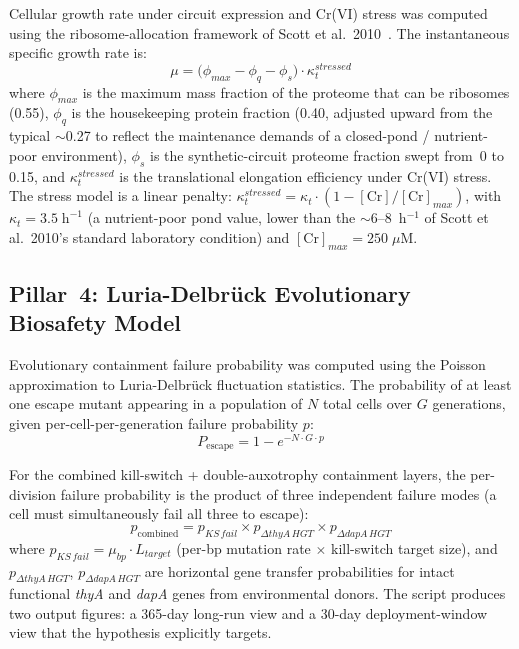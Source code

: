 \documentclass[10pt,twocolumn,letterpaper,
              colorlinks=true,
              linkcolor=blue!70!black,
              citecolor=blue!70!black,
              urlcolor=blue!70!black,
              pdfborder={0 0 0}]{article}
\begin{document}
Cellular growth rate under circuit expression and Cr(VI) stress was
computed using the ribosome-allocation framework of Scott et
al.~2010~\cite{scott2010}. The instantaneous specific growth rate is:
\begin{equation}
  \mu = \bigl(\phi_{max} - \phi_q - \phi_s\bigr)
        \cdot \kappa_t^{stressed}
\end{equation}
where $\phi_{max}$ is the maximum mass fraction of the proteome that can
be ribosomes (0.55), $\phi_q$ is the housekeeping protein fraction
(0.40, adjusted upward from the typical $\sim$0.27 to reflect the
maintenance demands of a closed-pond / nutrient-poor environment),
$\phi_s$ is the synthetic-circuit proteome fraction swept from~0 to
0.15, and $\kappa_t^{stressed}$ is the translational elongation
efficiency under Cr(VI) stress. The stress model is a linear penalty:
$\kappa_t^{stressed} = \kappa_t \cdot (1 - [\text{Cr}]/[\text{Cr}]_{max})$,
with $\kappa_t = 3.5\;\text{h}^{-1}$ (a nutrient-poor pond value, lower
than the $\sim$6--8~h$^{-1}$ of Scott et al.~2010's standard laboratory
condition) and $[\text{Cr}]_{max} = 250\;\mu$M.

\subsection{Pillar~4: Luria-Delbr\"{u}ck Evolutionary Biosafety Model}

Evolutionary containment failure probability was computed using the
Poisson approximation to Luria-Delbr\"{u}ck fluctuation statistics. The
probability of at least one escape mutant appearing in a population of
$N$ total cells over $G$ generations, given per-cell-per-generation
failure probability $p$:
\begin{equation}
  P_{\text{escape}} = 1 - e^{-N \cdot G \cdot p}
\end{equation}

For the combined kill-switch + double-auxotrophy containment layers, the
per-division failure probability is the product of three independent
failure modes (a cell must simultaneously fail all three to escape):
\begin{equation}
  p_{\text{combined}}
  = p_{KS\,fail} \times p_{\Delta thyA\,HGT}
    \times p_{\Delta dapA\,HGT}
\end{equation}
where $p_{KS\,fail} = \mu_{bp} \cdot L_{target}$ (per-bp mutation rate
$\times$ kill-switch target size), and $p_{\Delta thyA\,HGT}$,
$p_{\Delta dapA\,HGT}$ are horizontal gene transfer probabilities for
intact functional \textit{thyA} and \textit{dapA} genes from
environmental donors. The script produces two output figures: a 365-day
long-run view and a 30-day deployment-window view that the hypothesis
explicitly targets.
\end{document}
